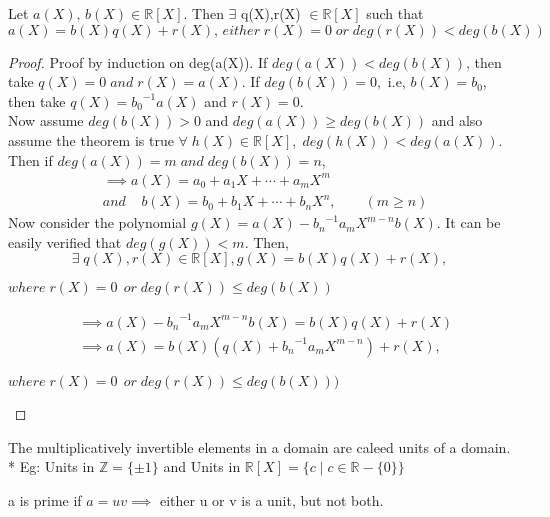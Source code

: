 \documentclass[10pt,a4paper]{article}
\begin{document}
\begin{theorem}
Let $a(X),\,b(X) \in \mathbb{R}[X]$. Then $\exists$ q(X),r(X) $\in \mathbb{R}[X]$ such that $$a(X)=b(X)q(X)+r(X),\, either\; r(X) = 0 \;or\; deg(r(X))<deg(b(X))$$
\end{theorem}

\begin{proof}
Proof by induction on deg(a(X)). If $deg(a(X))<deg(b(X))$, then take $q(X) = 0 \;and\; r(X) = a(X)$. If $deg(b(X)) = 0,$ i.e, $b(X) = b_{0}$, then take $q(X) = {b_{0}}^{-1}a(X)$ and $r(X) = 0$.\\
Now assume $deg(b(X)) > 0$ and $deg(a(X))\ge deg(b(X))$ and also assume the theorem is true $\forall\; h(X) \in \mathbb{R}[X],\; deg(h(X))<deg(a(X))$. \\
Then if $deg(a(X)) = m \;and\; deg(b(X)) = n$,
\begin{align*}
&\implies a(X) = a_{0} + a_{1}X + \cdots + a_{m}X^{m}\\
& and\;\;\;\; b(X) = b_{0} + b_{1}X + \cdots + b_{n}X^{n},\qquad(m\ge n)
\end{align*}
Now consider the polynomial $g(X) = a(X)-{b_{n}}^{-1}a_{m}X^{m-n}b(X)$. It can be easily verified that $deg(g(X)) < m$. Then,
$$\exists\; q(X),r(X)\in \mathbb{R}[X], g(X) = b(X)q(X)+r(X),$$
\begin{flushright}
$where\; r(X) = 0\,\; or\; deg(r(X)) \le deg(b(X))$
\end{flushright}
\begin{align*}
&\implies a(X)-{b_{n}}^{-1}a_{m}X^{m-n}b(X) = b(X)q(X)+r(X) \\
&\implies a(X) = b(X)(q(X)+{b_{n}}^{-1}a_{m}X^{m-n})+r(X),
\end{align*}
\begin{flushright}
$where\;r(X) = 0\,\; or\; deg(r(X)) \le deg(b(X))) $
\end{flushright}
\end{proof}

\begin{definition}[Unit]
The multiplicatively invertible elements in a domain are caleed units of a domain.
\\* Eg: Units in $\mathbb{Z} = \{\pm 1\}$ and Units in $\mathbb{R}[X] = \{c\mid c \in \mathbb{R}-\{0\}\}$
\end{definition}

\begin{definition}[Prime]
a is prime if $a = uv \implies$ either u or v is a unit, but not both.
\end{definition}
\end{document}
